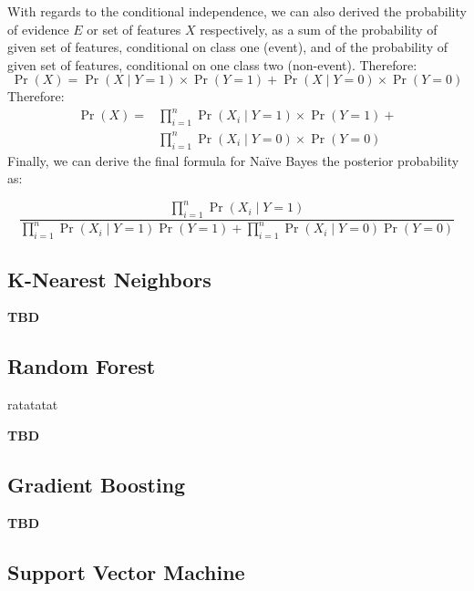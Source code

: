 With regards to the conditional independence, we can also derived the probability of evidence $E$ or set of features $X$ respectively, as a sum of the probability of given set of features, conditional on class one (event), and of the probability of given set of features, conditional on one class two (non-event).
Therefore:
\begin{equation}\label{eq}
\operatorname{Pr}\left(X\right) = \operatorname{Pr}\left(X \mid Y=1\right) \times \operatorname{Pr}\left(Y=1\right) + \operatorname{Pr}\left(X \mid Y=0\right) \times \operatorname{Pr}\left(Y=0\right)
\end{equation}
Therefore:
\begin{equation}\label{eq}
    \begin{aligned}
    \operatorname{Pr}\left(X\right) = {} & \prod_{i=1}^{n} \operatorname{Pr}\left(X_i \mid Y=1\right) \times \operatorname{Pr}\left(Y=1\right) + \\
    & \prod_{i=1}^{n} \operatorname{Pr}\left(X_i \mid Y=0\right) \times \operatorname{Pr}\left(Y=0\right)
    \end{aligned}
    \end{equation}
Finally, we can derive the final formula for Naïve Bayes the posterior probability as:

    \begin{equation}
        \frac{\displaystyle\prod_{i=1}^{n} \operatorname{Pr}(X_i \mid Y=1)}{\displaystyle\prod_{i=1}^{n} \operatorname{Pr}(X_i \mid Y=1) \operatorname{Pr}(Y=1) + \displaystyle\prod_{i=1}^{n} \operatorname{Pr}(X_i \mid Y=0) \operatorname{Pr}(Y=0)}
        \end{equation}


\subsection{K-Nearest Neighbors}

\textbf{TBD}
\subsection{Random Forest}

ratatatat \citep{rigatti2017random}

\textbf{TBD}
\subsection{Gradient Boosting}

\textbf{TBD}
\subsection{Support Vector Machine}

